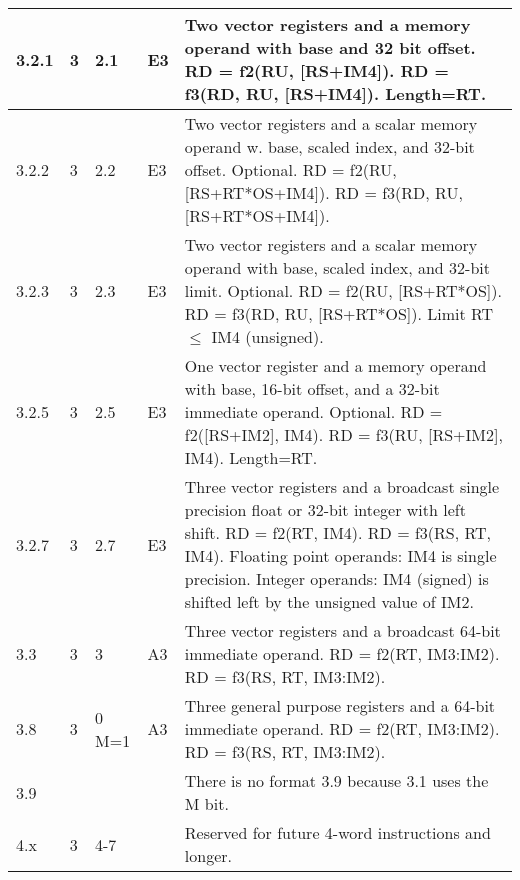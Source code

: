 \documentclass[forwardcom.tex]{subfiles}
\begin{document}
\begin{longtable} {|p{10mm}|p{6mm}|p{9mm}|p{7mm}|p{80mm}|}
\hline
3.2.1 & 3 & 2.1 & E3 & Two vector registers and a memory operand with base and 32 bit offset.\newline 
RD = f2(RU, [RS+IM4]). \newline 
RD = f3(RD, RU, [RS+IM4]). \newline 
Length=RT.\\

\hline
3.2.2 & 3 & 2.2 & E3 & Two vector registers and a scalar memory operand w. base, scaled index, and 32-bit offset. Optional. \newline 
RD = f2(RU, [RS+RT*OS+IM4]). \newline 
RD = f3(RD, RU, [RS+RT*OS+IM4]).\\

\hline
3.2.3 & 3 & 2.3 & E3 & Two vector registers and a scalar memory operand with base, scaled index, and 32-bit limit. Optional. \newline 
RD = f2(RU, [RS+RT*OS]). \newline 
RD = f3(RD, RU, [RS+RT*OS]). \newline 
Limit RT $\leq$ IM4 (unsigned).\\

\hline
3.2.5 & 3 & 2.5  & E3 & One vector register and a memory operand with base, 16-bit offset, and a 32-bit immediate operand. Optional. \newline 
RD = f2([RS+IM2], IM4). \newline 
RD = f3(RU, [RS+IM2], IM4). \newline 
Length=RT.\\

\hline
3.2.7 & 3 & 2.7 & E3 & Three vector registers and a broadcast single precision float or 32-bit integer with left shift.\newline 
RD = f2(RT, IM4). \newline 
RD = f3(RS, RT, IM4).\newline
Floating point operands: IM4 is single precision.
Integer operands: IM4 (signed) is shifted left by the unsigned value of IM2. \\

\hline
3.3 & 3 & 3 & A3 & Three vector registers and a broadcast 64-bit immediate operand.\newline 
RD = f2(RT, IM3:IM2). \newline 
RD = f3(RS, RT, IM3:IM2).\\

\hline
3.8 & 3 & 0 M=1 & A3 & Three general purpose registers and a 64-bit immediate operand. \newline 
RD = f2(RT, IM3:IM2). \newline 
RD = f3(RS, RT, IM3:IM2).\\

\hline
3.9 &  &  &  & There is no format 3.9 because 3.1 uses the M bit.\\

\hline
4.x & 3 & 4-7 &  & Reserved for future 4-word instructions and longer. \\
\hline
\end{longtable}
\end{document}
